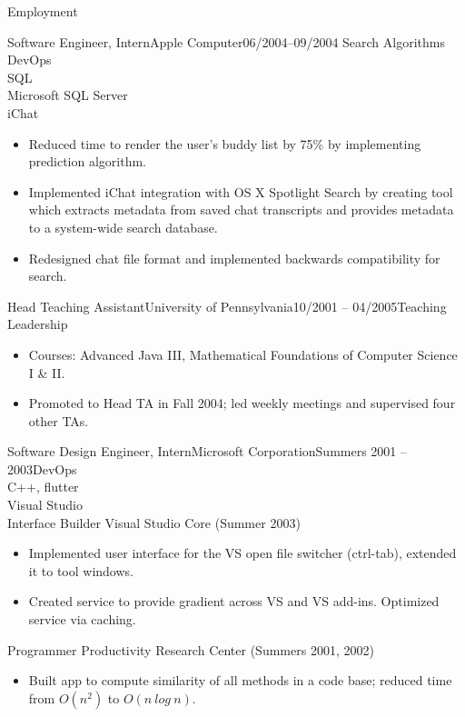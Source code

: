 \documentclass[]{mcdowellcv}
\begin{document}
	\makeheader
	
	\begin{cvsection}{Employment}
		\begin{cvkeywordsubsection}{Software Engineer, Intern}{Apple Computer}{06/2004--09/2004}{ Search Algorithms \\ DevOps \\ SQL \\ Microsoft SQL Server \\ iChat}
			\begin{itemize}
				\item Reduced time to render the user’s buddy list by 75\% by implementing prediction algorithm.
				\item Implemented iChat integration with OS X Spotlight Search by creating tool which extracts metadata from saved chat transcripts and provides metadata to a system-wide search database.
				\item Redesigned chat file format and implemented backwards compatibility for search.
			\end{itemize}
		\end{cvkeywordsubsection}
		
		\begin{cvkeywordsubsection}{Head Teaching Assistant}{University of Pennsylvania}{10/2001 -- 04/2005}{Teaching \\ Leadership}
			\begin{itemize}
				\item Courses: Advanced Java III, Mathematical Foundations of Computer Science I \& II.
				\item Promoted to Head TA in Fall 2004; led weekly meetings and supervised four other TAs.
			\end{itemize}
		\end{cvkeywordsubsection}
		
		\begin{cvkeywordsubsection}{Software Design Engineer, Intern}{Microsoft Corporation}{Summers 2001 -- 2003}{DevOps \\ C++, flutter \\ Visual Studio \\ Interface Builder}
			Visual Studio Core (Summer 2003)		
			\begin{itemize}
				\item Implemented user interface for the VS open file switcher (ctrl-tab), extended it to tool windows.
				\item Created service to provide gradient across VS and VS add-ins. Optimized service via caching.
			\end{itemize}
			Programmer Productivity Research Center (Summers 2001, 2002)
			\begin{itemize}
				\item Built app to compute similarity of all methods in a code base; reduced time from $O(n^2)$ to $O(n\ log\ n)$.
			\end{itemize}
		\end{cvkeywordsubsection}
	\end{cvsection}
	
\end{document}
